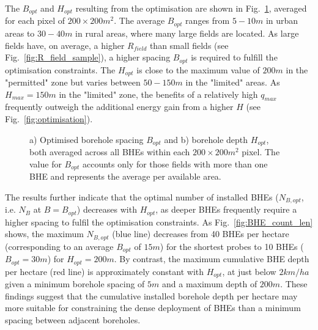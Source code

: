 The $B_{opt}$ and $H_{opt}$ resulting from the optimisation are shown in Fig.~\ref{fig:pixel_B_H}, averaged for each pixel of $200 \times 200m^2$. 
The average $B_{opt}$ ranges from $5-10m$ in urban areas to $30-40m$ in rural areas, where many large fields are located.
As large fields have, on average, a higher $R_{field}$ than small fields (see Fig.~\ref{fig:R_field_sample}), a higher spacing $B_{opt}$ is required to fulfill the optimisation constraints.
The $H_{opt}$ is close to the maximum value of $200m$ in the "permitted" zone but varies between $50-150m$ in the "limited" areas. 
As $H_{max} = 150m$ in the "limited" zone, the benefits of a relatively high $q_{max}$ frequently outweigh the additional energy gain from a higher $H$ (see Fig.~\ref{fig:optimisation}).

\begin{figure}[tb]
\centering
{}
\caption{a) Optimised borehole spacing $B_{opt}$ and b) borehole depth $H_{opt}$, both averaged across all BHEs within each $200 \times 200m^2$ pixel. The value for $B_{opt}$ accounts only for those fields with more than one BHE and represents the average per available area.}
\label{fig:pixel_B_H}
\end{figure}

The results further indicate that the optimal number of installed BHEs ($N_{B,opt}$, i.e. $N_B$ at $B = B_{opt}$) decreases with $H_{opt}$, as deeper BHEs frequently require a higher spacing to fulfil the optimisation constraints. 
As Fig.~\ref{fig:BHE_count_len} shows, the maximum $N_{B,opt}$ (blue line) decreases from 40 BHEs per hectare (corresponding to an average $B_{opt}$ of $15m$) for the shortest probes to 10 BHEs ($B_{opt} = 30m$) for $H_{opt} = 200m$. 
By contrast, the maximum cumulative BHE depth per hectare (red line) is approximately constant with $H_{opt}$, at just below $2 km / ha$ given a minimum borehole spacing of $5m$ and a maximum depth of $200m$. 
These findings suggest that the cumulative installed borehole depth per hectare may more suitable for constraining the dense deployment of BHEs than a minimum spacing between adjacent boreholes.
%

